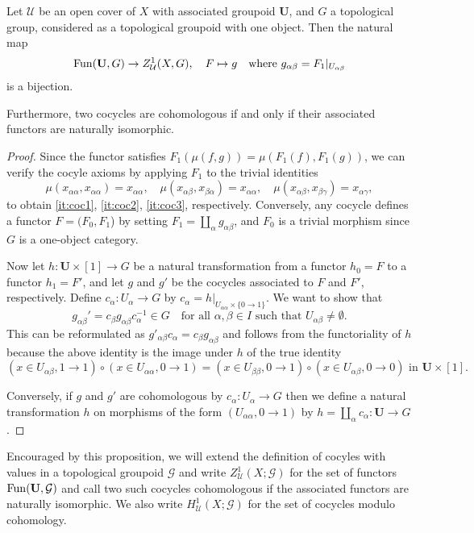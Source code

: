 \documentclass[a4paper,openany]{scrbook}
\begin{document}
\begin{prop} \label{prop:cocyclesasgroupoidmaps}
Let $\mathcal U$ be an open cover of $X$ with associated groupoid $\mathbf U$, and $G$ a topological group, considered as a topological groupoid with one object. Then the natural map
\[
\operatorname{Fun}(\mathbf U,G) \to Z^1_{\mathcal U}(X,G), \quad F \mapsto g \quad \text{where } g_{\alpha\beta} = F_1|_{U_{\alpha\beta}}
\]
is a bijection.

Furthermore, two cocycles are cohomologous if and only if their associated functors are naturally isomorphic.
\end{prop}
\begin{proof}
  Since the functor satisfies $F_1(\mu(f,g)) = \mu(F_1(f),F_1(g))$, we can verify the cocyle axioms by applying $F_1$ to the trivial identities 
  \[ 
      \mu(x_{\alpha\alpha},x_{\alpha\alpha}) = x_{\alpha\alpha},  \quad \mu(x_{\alpha\beta},x_{\beta\alpha}) = x_{\alpha\alpha}, \quad \mu(x_{\alpha\beta},x_{\beta\gamma}) = x_{\alpha\gamma}, 
  \] 
  to obtain \ref{it:coc1}, \ref{it:coc2}, \ref{it:coc3}, respectively.
  Conversely, any cocycle defines a functor $F=(F_0,F_1$) by setting $F_1=\coprod_{\alpha} g_{\alpha\beta}$, and $F_0$ is a trivial morphism since $G$ is a one-object category. 

  Now let $h\colon \mathbf U \times [1] \to G$ be a natural transformation from a functor $h_0=F$ to a functor $h_1=F'$, and let $g$ and $g'$ be the cocycles associated to $F$ and $F'$, respectively. Define $c_\alpha\colon U_\alpha \to G$ by $c_\alpha = h|_{U_{\alpha\alpha} \times \{0\to 1\} }$. We want to show that
\[
g_{\alpha\beta}' = c_\beta g_{\alpha\beta} c_\alpha^{-1} \in G \quad \text{for all } \alpha,\beta \in I \text{ such that } U_{\alpha\beta} \neq \emptyset.
\]
This can be reformulated as $g'_{\alpha\beta}c_\alpha = c_\beta g_{\alpha\beta}$ and follows from the functoriality of $h$ because the above identity is the image under $h$ of the true identity
\[
(x \in U_{\alpha\beta},1 \to 1) \circ (x \in U_{\alpha\alpha},0 \to 1) = (x \in U_{\beta\beta},0\to 1) \circ (x \in U_{\alpha\beta},0 \to 0) \text{ in } \mathbf U \times [1].
\]

Conversely, if $g$ and $g'$ are cohomologous by $c_\alpha\colon U_\alpha \to G$ then we define a natural transformation $h$ on morphisms of the form $(U_{\alpha\alpha}, 0 \to 1 )$ by $ h= \coprod_{\alpha}c_{\alpha}\colon \mathbf U \to G$.
\end{proof}

Encouraged by this proposition, we will extend the definition of cocyles with values in a topological groupoid $\mathcal G$ and write $Z^1_{\mathcal U}(X;\mathcal G)$ for the set of functors $\operatorname{Fun}(\mathbf U,\mathcal G)$ and call two such cocycles cohomologous if the associated functors are naturally isomorphic. We also write $H^1_{\mathcal U}(X;\mathcal G)$ for the set of cocycles modulo cohomology.
\end{document}
